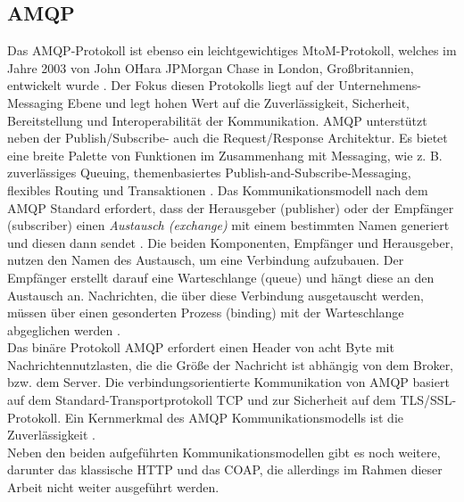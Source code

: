     \subsection{AMQP}
    \label{subsec:amqp}
        Das \ac{AMQP}-Protokoll ist ebenso ein leichtgewichtiges \acs{MtoM}-Protokoll, welches im Jahre 2003 von John O\'Hara JPMorgan Chase 
        in London, Großbritannien, entwickelt wurde \cite{Naik2017}. Der Fokus diesen Protokolls liegt auf der Unternehmens-Messaging Ebene 
        und legt hohen Wert auf die Zuverlässigkeit, Sicherheit, Bereitstellung und Interoperabilität der Kommunikation. \acs{AMQP} 
        unterstützt neben der Publish/Subscribe- auch die Request/Response Architektur. Es bietet eine breite Palette von 
        Funktionen im Zusammenhang mit Messaging, wie z. B. zuverlässiges Queuing, themenbasiertes Publish-and-Subscribe-Messaging, 
        flexibles Routing und Transaktionen \cite{Naik2017}. Das Kommunikationsmodell nach dem \acs{AMQP} Standard erfordert, dass der 
        Herausgeber (publisher) oder der Empfänger (subscriber) einen \textit{Austausch (exchange)} mit einem bestimmten Namen generiert 
        und diesen dann sendet \cite{Naik2017}. Die beiden Komponenten, Empfänger und Herausgeber, nutzen den Namen des Austausch, um eine 
        Verbindung aufzubauen. Der Empfänger erstellt darauf eine Warteschlange (queue) und hängt diese an den Austausch an. Nachrichten, die 
        über diese Verbindung ausgetauscht werden, müssen über einen gesonderten Prozess (binding) mit der Warteschlange abgeglichen werden 
        \cite{Naik2017}.
        \\ 
        Das binäre Protokoll \acs{AMQP} erfordert einen Header von acht Byte mit Nachrichtennutzlasten, die die Größe der Nachricht ist abhängig 
        von dem Broker, bzw. dem Server. Die verbindungsorientierte Kommunikation von \acs{AMQP} basiert auf dem Standard-Transportprotokoll 
        \acs{TCP} und zur Sicherheit auf dem \acs{TLS}/\acs{SSL}-Protokoll. Ein Kernmerkmal des \acs{AMQP} Kommunikationsmodells ist die 
        Zuverlässigkeit \cite{Naik2017}. 
        \\
        \linebreak
        Neben den beiden aufgeführten Kommunikationsmodellen gibt es noch weitere, darunter das klassische \ac{HTTP} und das \ac{COAP}, die allerdings im Rahmen dieser Arbeit nicht weiter ausgeführt werden. 
        
